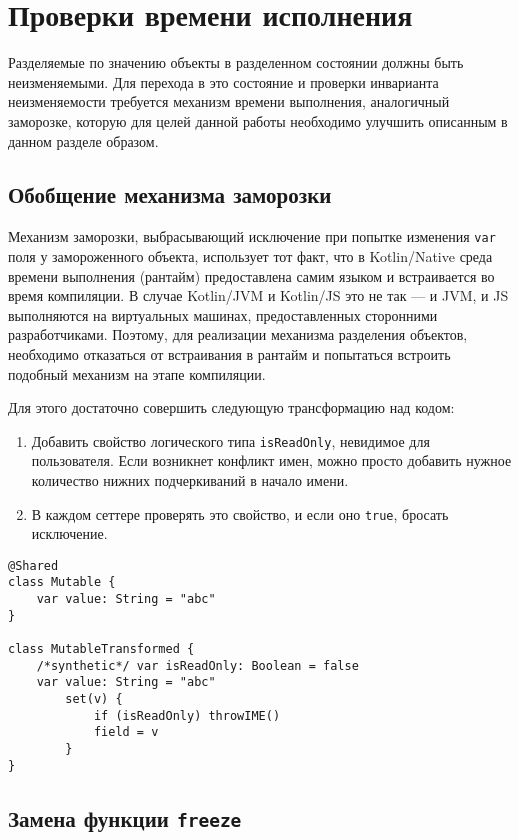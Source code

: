 \documentclass[specification,annotation,times]{itmo-student-thesis}
\begin{document}
\section{Проверки времени исполнения}

Разделяемые по значению объекты в разделенном состоянии должны быть неизменяемыми.
Для перехода в это состояние и проверки инварианта неизменяемости требуется механизм времени выполнения, аналогичный заморозке, которую для целей данной работы необходимо улучшить описанным в данном разделе образом. 

\subsection{Обобщение механизма заморозки}

Механизм заморозки, выбрасывающий исключение при попытке изменения \texttt{var} поля у замороженного объекта, использует тот факт, что в Kotlin/Native среда времени выполнения (рантайм) предоставлена самим языком и встраивается во время компиляции.
В случае Kotlin/JVM и Kotlin/JS это не так –-- и JVM, и JS выполняются на виртуальных машинах, предоставленных сторонними разработчиками.
Поэтому, для реализации механизма разделения объектов, необходимо отказаться от встраивания в рантайм и попытаться встроить подобный механизм на этапе компиляции.

Для этого достаточно совершить следующую трансформацию над кодом: 

\begin{enumerate}
	\item Добавить свойство логического типа \texttt{isReadOnly}, невидимое для пользователя. Если возникнет конфликт имен, можно просто добавить нужное количество нижних подчеркиваний в начало имени.
	\item В каждом сеттере проверять это свойство, и если оно \texttt{true}, бросать исключение.
\end{enumerate}

\begin{lstlisting}[float=h!,caption={Код до и после трансформации}]
@Shared
class Mutable {
	var value: String = "abc"
}

class MutableTransformed {
	/*synthetic*/ var isReadOnly: Boolean = false
	var value: String = "abc"
		set(v) {
			if (isReadOnly) throwIME() 
			field = v
		}
}
\end{lstlisting}

\subsection{Замена функции \texttt{freeze}}\label{def_share}
\end{document}

